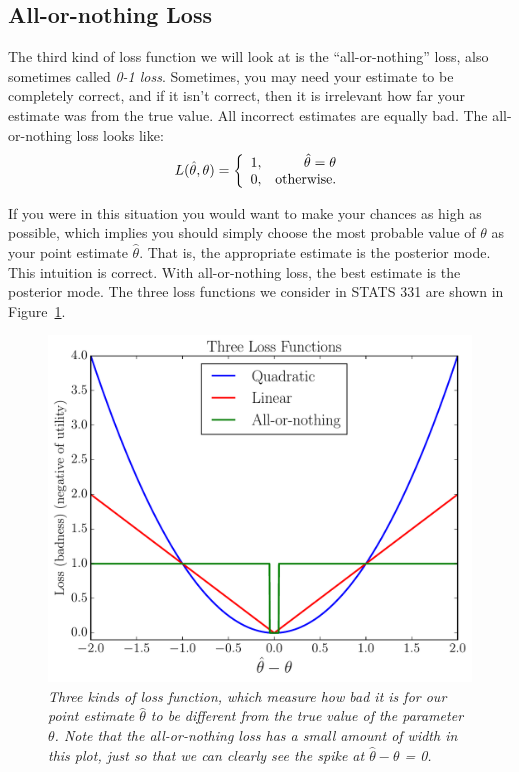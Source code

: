 \subsection{All-or-nothing Loss}
The third kind of loss function we will look at is the ``all-or-nothing'' loss,
also sometimes called {\it 0-1 loss}.
Sometimes, you may need your estimate to be
completely correct, and if it isn't correct, then it is irrelevant how far your
estimate was from the true value. All incorrect estimates are equally bad.
The all-or-nothing loss looks like:
\begin{eqnarray}
L(\hat{\theta}, \theta) = \left\{
\begin{array}{lr}
1, & \hat{\theta} = \theta\\
0, & \textnormal{otherwise.}
\end{array}
\right.
\end{eqnarray}

If you were in this situation you would want to make your chances as high as
possible, which implies you should simply choose the most probable value
of $\theta$ as your point estimate $\hat{\theta}$. That is, the appropriate
estimate is the posterior mode. This intuition is correct. With all-or-nothing loss,
the best estimate is the posterior mode. The three loss functions we consider
in STATS 331 are shown in Figure~\ref{fig:utility}.

\begin{figure}[ht!]
\begin{center}
\includegraphics[scale=0.5]{Figures/utility.pdf}
\caption{\it Three kinds of loss function, which measure how bad it is for our
point estimate $\hat{\theta}$ to be different from the true value of the parameter
$\theta$. Note that the all-or-nothing loss has a small amount of width in this
plot, just so that we can clearly see the spike at
$\hat{\theta} - \theta$ = 0.\label{fig:utility}}
\end{center}
\end{figure}

